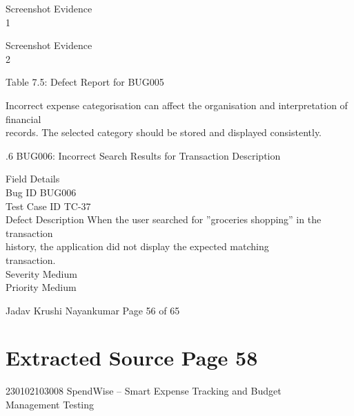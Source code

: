 \documentclass[12pt,a4paper]{report}
\begin{document}
\smallskip
Screenshot Evidence\\ 
1\\ 

\smallskip

\smallskip

\smallskip

\smallskip
Screenshot Evidence\\ 
2\\ 

\smallskip

\smallskip

\smallskip

\smallskip
Table 7.5: Defect Report for BUG005\\ 

\smallskip

\smallskip
Incorrect expense categorisation can affect the organisation and interpretation of financial\\ 
records. The selected category should be stored and displayed consistently.\\ 

\smallskip

.6 BUG006: Incorrect Search Results for Transaction Description\\ 

\smallskip

\smallskip
Field                 Details\\ 
Bug ID                BUG006\\ 
Test Case ID          TC-37\\ 
Defect Description    When the user searched for ”groceries shopping” in the transaction\\ 
history, the application did not display the expected matching\\ 
transaction.\\ 
Severity              Medium\\ 
Priority              Medium\\ 

\smallskip

\smallskip
Jadav Krushi Nayankumar                                                         Page 56 of 65\\ 

\clearpage
\section*{Extracted Source Page 58}
230102103008                           SpendWise – Smart Expense Tracking and Budget\\ 
Management Testing\\ 
\end{document}
